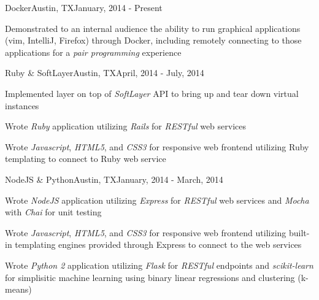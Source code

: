 \documentclass[10pt,a4paper]{article}
\begin{document}
{\begin{resumeinfo}{Docker}{Austin, TX}{January, 2014 - Present}
        \item Demonstrated to an internal audience the ability to run graphical
        applications (vim, IntelliJ, Firefox) through Docker, including 
        remotely connecting to those applications for a 
        \textit{pair programming} experience
    \end{resumeinfo}
    \addvspace{1em}
    \begin{resumeinfo}{Ruby \& SoftLayer}{Austin, TX}{April, 2014 - July, 2014}
        \item Implemented layer on top of \textit{SoftLayer} API to bring up
        and tear down virtual instances

        \item Wrote \textit{Ruby} application utilizing \textit{Rails} for
        \textit{RESTful} web services

        \item Wrote \textit{Javascript}, \textit{HTML5}, and \textit{CSS3} for
        responsive web frontend utilizing Ruby templating to connect to Ruby 
        web service
    \end{resumeinfo}
    \addvspace{1em}
    \begin{resumeinfo}{NodeJS \& Python}{Austin, TX}{January, 2014 - March, 2014}
        \item Wrote \textit{NodeJS} application utilizing \textit{Express} for 
        \textit{RESTful} web services and \textit{Mocha} with \textit{Chai}
        for unit testing

        \item Wrote \textit{Javascript}, \textit{HTML5}, and \textit{CSS3} for
        responsive web frontend utilizing built-in templating engines provided
        through Express to connect to the web services

        \item Wrote \textit{Python 2} application utilizing \textit{Flask} for
        \textit{RESTful} endpoints and \textit{scikit-learn} for simplisitic
        machine learning using binary linear regressions and clustering 
        (k-means)
    \end{resumeinfo}
}
    
\end{document}
